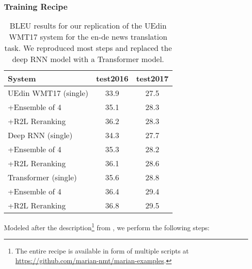 \documentclass[11pt,a4paper]{article}
\begin{document}
\subsubsection{Training Recipe}

\begin{table}[t]
\centering
\begin{tabular}{lcc}\toprule
System &	test2016 &	test2017 \\ \midrule
UEdin WMT17 (single) & 33.9 & 27.5 \\ 
+Ensemble of 4 & 35.1 & 28.3 \\ 
+R2L Reranking & 36.2 &	28.3 \\ \midrule \midrule
Deep RNN (single) & 34.3 & 27.7 \\ 
+Ensemble of 4 & 35.3 & 28.2 \\ 
+R2L Reranking & 36.1 & 28.6 \\ \midrule
Transformer (single) &	35.6 &	28.8 \\
+Ensemble of 4 &	36.4 &	29.4 \\ 
+R2L Reranking &	36.8 &	29.5 \\ \bottomrule
\end{tabular}
\caption{BLEU results for our replication of the UEdin WMT17 system for the en-de news translation task.
We reproduced most steps and replaced the deep RNN model with a Transformer model.}
\label{wmt-bleu}
\end{table}

Modeled after the description\footnote{The entire recipe is available in form of multiple scripts at \url{https://github.com/marian-nmt/marian-examples}.} from , we perform the following steps:
\end{document}
